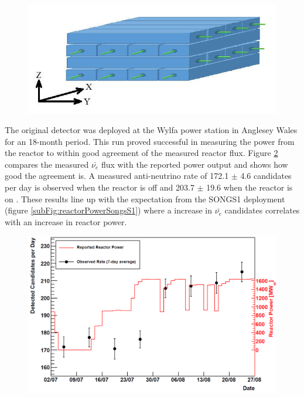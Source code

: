 \begin{figure}[!h]
\centering
  \centering
  \includegraphics[width=0.6\linewidth]{Chapter2/Figs/Raster/VIDARR_diagram.jpeg}
  \label{fig:vidarrDiagram}
\end{figure}

The original detector was deployed at the Wylfa power station in Anglesey Wales for an 18-month period. This run proved successful in measuring the power from the reactor to within good agreement of the measured reactor flux. Figure \ref{fig:prototypeMeasumentFlux} compares the measured $\bar{\nu_e}$ flux with the reported power output and shows how good the agreement is. A measured anti-neutrino rate of 172.1 $\pm$ 4.6 candidates per day is observed when the reactor is off and 203.7 $\pm$ 19.6 when the reactor is on \cite{Carroll_2018}. These results line up with the expectation from the SONGS1 deployment (figure \ref{subFig:reactorPowerSongsS1}) where a increase in $\bar{\nu_e}$ candidates correlates with an increase in reactor power. %
\begin{figure}[!h]
 \centering
 \includegraphics[width=0.7\linewidth]{Chapter2/Figs/Raster/prototypeMeasureOnFig.png} 
 \label{fig:prototypeMeasumentFlux}
\end{figure}

